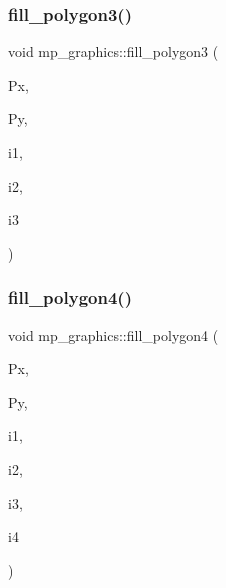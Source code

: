 \subsubsection{\texorpdfstring{fill\+\_\+polygon3()}{fill\_polygon3()}}
{\footnotesize\ttfamily void mp\+\_\+graphics\+::fill\+\_\+polygon3 (\begin{DoxyParamCaption}\item[{\mbox{\hyperlink{galois_8h_a09fddde158a3a20bd2dcadb609de11dc}{I\+NT}} $\ast$}]{Px,  }\item[{\mbox{\hyperlink{galois_8h_a09fddde158a3a20bd2dcadb609de11dc}{I\+NT}} $\ast$}]{Py,  }\item[{\mbox{\hyperlink{galois_8h_a09fddde158a3a20bd2dcadb609de11dc}{I\+NT}}}]{i1,  }\item[{\mbox{\hyperlink{galois_8h_a09fddde158a3a20bd2dcadb609de11dc}{I\+NT}}}]{i2,  }\item[{\mbox{\hyperlink{galois_8h_a09fddde158a3a20bd2dcadb609de11dc}{I\+NT}}}]{i3 }\end{DoxyParamCaption})}

\mbox{\label{classmp__graphics_a2ad6347434ca3a2be7a1fc99d09e59cf}} 
\subsubsection{\texorpdfstring{fill\+\_\+polygon4()}{fill\_polygon4()}}
{\footnotesize\ttfamily void mp\+\_\+graphics\+::fill\+\_\+polygon4 (\begin{DoxyParamCaption}\item[{\mbox{\hyperlink{galois_8h_a09fddde158a3a20bd2dcadb609de11dc}{I\+NT}} $\ast$}]{Px,  }\item[{\mbox{\hyperlink{galois_8h_a09fddde158a3a20bd2dcadb609de11dc}{I\+NT}} $\ast$}]{Py,  }\item[{\mbox{\hyperlink{galois_8h_a09fddde158a3a20bd2dcadb609de11dc}{I\+NT}}}]{i1,  }\item[{\mbox{\hyperlink{galois_8h_a09fddde158a3a20bd2dcadb609de11dc}{I\+NT}}}]{i2,  }\item[{\mbox{\hyperlink{galois_8h_a09fddde158a3a20bd2dcadb609de11dc}{I\+NT}}}]{i3,  }\item[{\mbox{\hyperlink{galois_8h_a09fddde158a3a20bd2dcadb609de11dc}{I\+NT}}}]{i4 }\end{DoxyParamCaption})}

